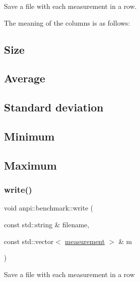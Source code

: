 Save a file with each measurement in a row.

The meaning of the columns is as follows\+: \subsection*{Size}

\subsection*{Average}

\subsection*{Standard deviation}

\subsection*{Minimum}

\subsection*{Maximum}\mbox{\label{namespaceanpi_1_1benchmark_a7ef3ea8c9c9a8b79e1e37df28b3615ce}} 
\subsubsection{\texorpdfstring{write()}{write()}\hspace{0.1cm}{\footnotesize\ttfamily [2/2]}}
{\footnotesize\ttfamily void anpi\+::benchmark\+::write (\begin{DoxyParamCaption}\item[{const std\+::string \&}]{filename,  }\item[{const std\+::vector$<$ \hyperlink{structanpi_1_1benchmark_1_1measurement}{measurement} $>$ \&}]{m }\end{DoxyParamCaption})}

Save a file with each measurement in a row 